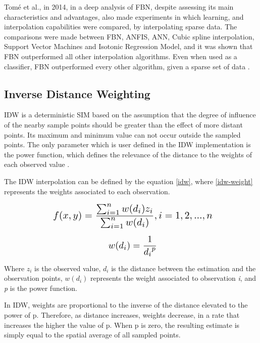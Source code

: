 Tomé et al., in 2014, in a deep analysis of FBN, despite assessing its main characteristics and advantages, also made experiments in which learning, and interpolation capabilities were compared, by interpolating sparse data. The comparisons were made between FBN, \ac{ANFIS}, ANN, Cubic spline interpolation, Support Vector Machines and Isotonic Regression Model, and it was shown that FBN outperformed all other interpolation algorithms. Even when used as a classifier, FBN outperformed every other algorithm, given a sparse set of data \cite{Tome2014}.

\subsection{Inverse Distance Weighting}

IDW is a deterministic SIM based on the assumption that the degree of influence of the nearby sample points should be greater than the effect of more distant points. Its maximum and minimum value can not occur outside the sampled points. The only parameter which is user defined in the IDW implementation is the power function, which defines the relevance of the distance to the weights of each observed value \cite{Mesquita2009}.

The IDW interpolation can be defined by the equation \eqref{idw}, where \eqref{idw-weight} represents the weights associated to each observation.

\begin{equation} 
\label{idw}
\scalebox{1.4}{ $ f(x, y) = \dfrac{\sum_{i=1}^{n} w(d_i)z_i}{\sum_{i=1}^{n} w(d_i)}, i = 1, 2, ..., n$}
\end{equation}

\begin{equation} 
\label{idw-weight}
\scalebox{1.3}{ $w(d_i)= \dfrac{1}{{d_i}^{p}}$}
\end{equation}

Where $z_i$ is the observed value, $d_i$ is the distance between the estimation and the observation points, $w(d_i)$ represents the weight associated to observation \textit{i}, and \textit{p} is the power function.

In IDW, weights are proportional to the inverse of the distance elevated to the power of p. Therefore, as distance increases, weights decrease, in a rate that increases the higher the value of p.
When p is zero, the resulting estimate is simply equal to the spatial average of all sampled points.


